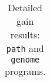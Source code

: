 \begin{table}[ht]
{\begin{tabular}{cc|c|cc|cc}
\hline
\end{tabular}
}
\caption{Detailed gain results: \texttt{path} and \texttt{genome} programs.}
\label{tbl:results_detail_gain_tst}
\end{table}
